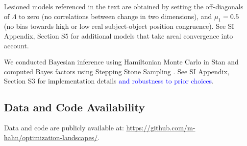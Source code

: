 \documentclass[9pt,twocolumn,twoside,lineno]{pnas-new}
\begin{document}
{Lesioned models referenced in the text are obtained by setting the off-diagonals of $\Lambda$ to zero (no correlations between change in two dimensions), and $\mu_1=0.5$ (no bias towards high or low real subject-object position congruence).
See SI Appendix, Section S5 for additional models that take areal convergence into account.


We conducted Bayesian inference using Hamiltonian Monte Carlo in Stan \citep{homan2014the,carpenter2017stan} and computed Bayes factors using Stepping Stone Sampling \citep{xie2011improving}.
See SI Appendix, Section S3 for implementation details \textcolor{blue}{and robustness to prior choices}.


	\subsection*{Data and Code Availability} Data and code are publicly available at:
\url{https://github.com/m-hahn/optimization-landscapes/}.



}

\showmatmethods{} %


\showacknow{} %

%

\end{document}
